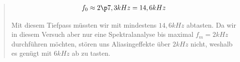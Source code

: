 \begin{quote}
    \begin{equation}
    \begin{split}
        f_0 \approx 2 \p 7,3 kHz = 14,6 kHz
    \end{split}
    \end{equation}
    
    
    Mit diesem Tiefpass müssten wir mit mindestens $14,6 kHz$ abtasten. Da wir in diesem Versuch aber nur eine
    Spektralanalyse bis maximal $f_m = 2 kHz$ durchführen möchten, stören uns Aliasingeffekte über $2 kHz$ nicht, weshalb
    es genügt mit $6 kHz$ ab zu tasten.
    
    
    

    
\end{quote}



